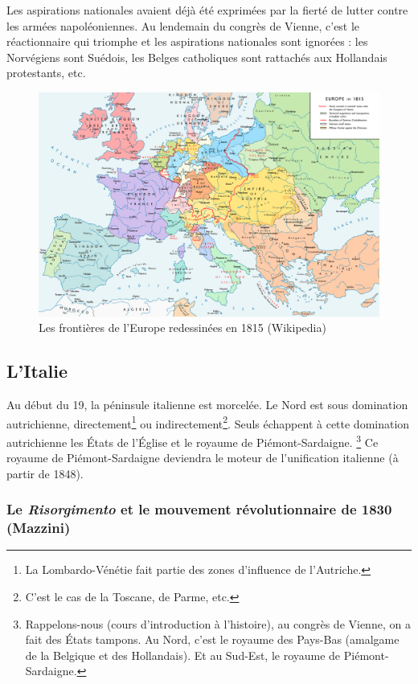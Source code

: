 \documentclass[12pt]{report}
\begin{document}
Les aspirations nationales avaient déjà été exprimées par la fierté de lutter contre les armées napoléoniennes.
Au lendemain du congrès de Vienne, c’est le réactionnaire qui triomphe et les aspirations nationales sont ignorées : les Norvégiens sont Suédois, les Belges catholiques sont rattachés aux Hollandais protestants, etc.

\begin{figure}
	\centering
	\includegraphics[width=\textwidth]{europe_congres_vienne.png}
	\caption{Les frontières de l'Europe redessinées en 1815 (Wikipedia)}
	\label{fig:my_label}
\end{figure}

\subsection{L'Italie}

Au début du 19, la péninsule italienne est morcelée.
Le Nord est sous domination autrichienne, directement\footnote{La Lombardo-Vénétie fait partie des zones d'influence de l'Autriche.} ou indirectement\footnote{C'est le cas de la Toscane, de Parme, etc.}.
Seuls échappent à cette domination autrichienne les États de l'Église et le royaume de Piémont-Sardaigne.
\footnote{Rappelons-nous (cours d'introduction à l'histoire), au congrès de Vienne, on a fait des États tampons. Au Nord, c'est le royaume des Pays-Bas (amalgame de la Belgique et des Hollandais). Et au Sud-Est, le royaume de Piémont-Sardaigne.}
Ce royaume de Piémont-Sardaigne deviendra le moteur de l'unification italienne (à partir de 1848).

\subsubsection{Le \emph{Risorgimento} et le mouvement révolutionnaire de 1830 (Mazzini)}
\end{document}
